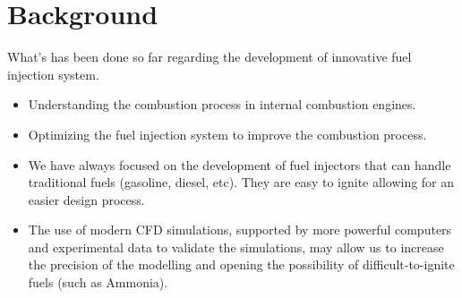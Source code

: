\section{Background}
\label{sec:background}

What's has been done so far regarding the development of innovative fuel injection system.

\begin{itemize}
    \item Understanding the combustion process in internal combustion engines.
    \item Optimizing the fuel injection system to improve the combustion process.
    \item We have always focused on the development of fuel injectors that can handle traditional fuels (gasoline, diesel, etc). They are easy to ignite allowing for an easier design process.
    \item The use of modern CFD simulations, supported by more powerful computers and experimental data to validate the simulations, may allow us to increase the precision of the modelling and opening the possibility of difficult-to-ignite fuels (such as Ammonia).
\end{itemize}
